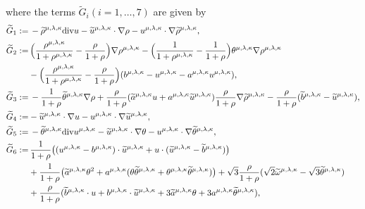\documentclass[reqno,11pt]{amsart}
\theoremstyle{plain}
\numberwithin{equation}{section}
\begin{document}
where the terms $\widetilde{G}_i(i=1,\dots,7)$  are given by
\begin{equation*}
\begin{aligned}
\widetilde{G}_1:=&\, -\widetilde{\rho}^{{\mu,\lambda,\kappa}}{\rm div}u-\widetilde{u}^{{\mu,\lambda,\kappa}}\cdot\nabla\rho-u^{\mu,\lambda,\kappa}\cdot\nabla\widetilde{\rho}^{\mu,\lambda,\kappa}  ,\\
\widetilde{G}_2:=&\,\Big(\frac{\rho^{\mu,\lambda,\kappa}}{1+\rho^{\mu,\lambda,\kappa}}-\frac{\rho }{1+\rho }\Big) \nabla\rho^{{\mu,\lambda,\kappa}}-\Big(\frac{1}{1+\rho^{\mu,\lambda,\kappa}}-\frac{1}{1+\rho}\Big)\theta^{{\mu,\lambda,\kappa}} \nabla\rho^{{\mu,\lambda,\kappa}} \\
&-\Big(\frac{\rho^{\mu,\lambda,\kappa}}{1+\rho^{\mu,\lambda,\kappa}}-\frac{\rho }{1+\rho }\Big) ( b^{\mu,\lambda,\kappa}-u^{\mu,\lambda,\kappa}-a^{\mu,\lambda,\kappa} u^{\mu,\lambda,\kappa}),\nonumber\\
\widetilde{G}_3:=&\,-\frac{1}{1+\rho} \widetilde{\theta}^{{\mu,\lambda,\kappa}}\nabla\rho +\frac{\rho}{1+\rho}(\widetilde{a}^{\mu,\lambda,\kappa} u+a^{\mu,\lambda,\kappa}\widetilde{u}^{\mu,\lambda,\kappa}) \frac{\rho}{1+\rho}\nabla\widetilde{\rho}^{{\mu,\lambda,\kappa}}-\frac{\rho}{1+\rho} (\widetilde{b}^{\mu,\lambda,\kappa}-\widetilde{u}^{\mu,\lambda,\kappa})  ,\\
\widetilde{G}_4:=&-\widetilde{u}^{\mu,\lambda,\kappa}\cdot\nabla u-u^{\mu,\lambda,\kappa}\cdot\nabla\widetilde{u}^{\mu,\lambda,\kappa},\nonumber\\
\widetilde{G}_5:=&\,-\widetilde{\theta}^{{\mu,\lambda,\kappa}}{\rm div}u^{{\mu,\lambda,\kappa}} -\widetilde{u}^{{\mu,\lambda,\kappa}}\cdot\nabla\theta-{u}^{{\mu,\lambda,\kappa}}\cdot\nabla\widetilde{\theta}^{{\mu,\lambda,\kappa}},\\
\widetilde{G}_6:=&\,\frac{1}{1+\rho}\big((u^{\mu,\lambda,\kappa}-b^{\mu,\lambda,\kappa})\cdot\widetilde{u}^{\mu,\lambda,\kappa}+u\cdot(\widetilde{u}^{\mu,\lambda,\kappa}-\widetilde{b}^{\mu,\lambda,\kappa}) \big) \nonumber\\
&+\frac{1}{1+\rho}\big( \widetilde{a}^{\mu,\lambda,\kappa}\theta^2+a^{\mu,\lambda,\kappa}(\theta\widetilde{\theta}^{\mu,\lambda,\kappa}+\theta^{\mu,\lambda,\kappa}\widetilde{\theta}^{\mu,\lambda,\kappa})\big) +\sqrt{3}\frac{\rho}{1+\rho}(\sqrt{2}\widetilde{\omega}^{\mu,\lambda,\kappa}-\sqrt{3}\widetilde\theta^{\mu,\lambda,\kappa})\nonumber\\
&+\frac{\rho}{1+\rho}(\widetilde{b}^{\mu,\lambda,\kappa}\cdot u+b^{\mu,\lambda,\kappa}\cdot \widetilde{u}^{\mu,\lambda,\kappa}+3\widetilde{a}^{\mu,\lambda,\kappa}\theta+3 {a}^{\mu,\lambda,\kappa}\widetilde{\theta}^{\mu,\lambda,\kappa}),\nonumber\\

\end{aligned}
\end{equation*}
\end{document}
